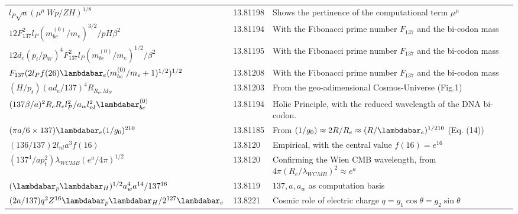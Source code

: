 \documentclass[a4paper,9pt]{article}
\begin{document}
\begin{table}
\begin{tabular}{lll}
 
 $ l_{P} \sqrt a (\mu^{\mu}~Wp/ZH)^{1/8}$  & 13.81198 & Shows the pertinence of the computational term $\mu^{\mu}$   \\
 
 
  $12 F_{137}^2 l_P(m_{bc}^{(0)}/m_e)^{3/2}/pH\beta^2$ & 13.81194    & With the Fibonacci prime number $F_{137}$ and the bi-codon mass\\
  
  $12 d_e (p_t/p_W)^4 F_{137}^2 l_P(m_{bc}^{(0)}/m_e)^{1/2}/\beta^2$ & 13.81195    & With the Fibonacci prime number $F_{137}$ and the bi-codon mass\\
  
  $F_{137} (2 l_P f(26) \lambdabar_{e}(m_{bc}^{(0)}/m_e+1)^{1/2})^{1/2}$ & 13.81208    & With the Fibonacci prime number $F_{137}$ and the bi-codon mass\\
 
 
 
  $(H/p_t)(ad_e/137)^4 R_{R_c,M_N} $ & 13.81203    & From the geo-adimensional Cosmos-Universe (Fig.1)\\
  
  
 
 $(137\beta/a)^2R_cR_el_P^2/a_w l_{nl}^2\lambdabar_{bc}^{(0)}$ & 13.81194    &  Holic Principle, with the reduced wavelength of the DNA bi-codon. \\
  
 
 
$(\pi a/6\times 137) \lambdabar_e (1/g_0)^{210} $ & 13.81185 & From $(1/g_0) \approx 2R/R_e \approx (R/\lambdabar_e)^{1/210}$ (Eq. (14)) \\  
     
  
 $ (136/137)2l_{nl}a^3f(16)$  & 13.8120    & Empirical, with the central value $f(16) = e^{16}$ \\ 
 
  $ (137^4/ap_t^2)\lambda_{WCMB}(e^a/4\pi)^{1/2}$  & 13.8120    & Confirming the Wien CMB wavelength, from $4\pi (R_e/\lambda_{WCMB})^2 \approx e^{a}$ \\ 
 
 
  
  
 $(\lambdabar_{p} \lambdabar_{H})^{1/2} a_w^4 a^{14}/137^{16}$  & 13.8119    &  $137,a,a_w$ as computation basis \\
 
 
 
 
  $(2a/137)q^2 Z^{16} \lambdabar_{p} \lambdabar_{H}/2^{127}\lambdabar_{e} $  & 13.8221    & Cosmic role of electric charge $q = g_1 \cos \theta = g_2 \sin \theta$  \\
 

\end{tabular}
\end{table}
\end{document}
